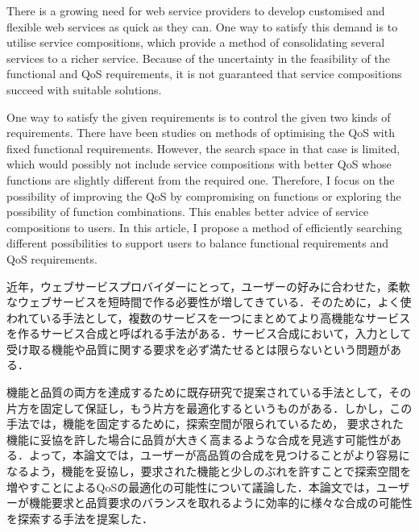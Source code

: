 \documentclass[senior,final,11pt]{iscs-thesis}
\date{February 9, 2016}
\begin{document}
\begin{eabstract}
There is a growing need for web service providers to develop customised and flexible web services as quick as they can. One way to satisfy this demand is to utilise service compositions, which provide a method of consolidating several services to a richer service. Because of the uncertainty in the feasibility of the functional and QoS requirements, it is not guaranteed that service compositions succeed with suitable solutions.

One way to satisfy the given requirements is to control the given two kinds of requirements. There have been studies on methods of optimising the QoS with fixed functional requirements. However, the search space in that case is limited, which would possibly not include service compositions with better QoS whose functions are slightly different from the required one. Therefore, I focus on the possibility of improving the QoS by compromising on functions or exploring the possibility of function combinations. This enables better advice of service compositions to users. In this article, I propose a method of efficiently searching different possibilities to support users to balance functional requirements and QoS requirements.
\end{eabstract}
\begin{jabstract}
近年，ウェブサービスプロバイダーにとって，ユーザーの好みに合わせた，柔軟なウェブサービスを短時間で作る必要性が増してきている．そのために，よく使われている手法として，複数のサービスを一つにまとめてより高機能なサービスを作るサービス合成と呼ばれる手法がある．サービス合成において，入力として受け取る機能や品質に関する要求を必ず満たせるとは限らないという問題がある．

機能と品質の両方を達成するために既存研究で提案されている手法として，その片方を固定して保証し，もう片方を最適化するというものがある．しかし，この手法では，機能を固定するために，探索空間が限られているため，
要求された機能に妥協を許した場合に品質が大きく高まるような合成を見逃す可能性がある．よって，本論文では，ユーザーが高品質の合成を見つけることがより容易になるよう，機能を妥協し，要求された機能と少しのぶれを許すことで探索空間を増やすことによるQoSの最適化の可能性について議論した．本論文では，ユーザーが機能要求と品質要求のバランスを取れるように効率的に様々な合成の可能性を探索する手法を提案した．

\end{jabstract}
\maketitle
\end{document}
